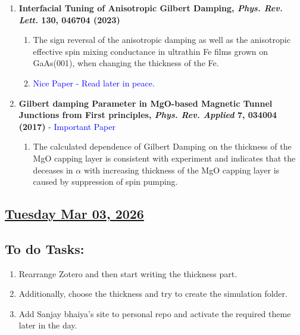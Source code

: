 \begin{enumerate}
\begin{enumerate}[(1.)]
\begin{enumerate}[\ding{217}]
            \item The strong coupling between magnonic and phonic modes in both polycrystalline and single-crystalline CoFe nanomagnets is observed using TRMOKE.
            \item The enhanced coupling strength in the single-crystalline CoFe nanomagnet is attributed to the higher magnetorestriction in CoFe systems and lower intrinsic magnetic damping.
            \item The relative values for the $\mathrm{\alpha_{eff}}$ was observed for different frequencies.
        \end{enumerate}
        \item \textbf{Interfacial Tuning of Anisotropic Gilbert Damping, \textit{Phys. Rev. Lett.} 130, 046704 (2023)} 
        \begin{enumerate}[\ding{217}]
            \item The sign reversal of the anisotropic damping as well as the anisotropic effective spin mixing conductance in ultrathin Fe films grown on GaAs(001), when changing the thickness of the Fe.
            \item \textcolor{blue}{Nice Paper - Read later in peace.}
        \end{enumerate}
        \item \textbf{Gilbert damping Parameter in MgO-based Magnetic Tunnel Junctions from First principles, \textit{Phys. Rev. Applied} 7, 034004 (2017)} - \textcolor{blue}{Important Paper}  
        \begin{enumerate}[\ding{217}]
            \item The calculated dependence of Gilbert Damping on the thickness of the MgO capping layer is consistent with experiment and indicates that the deceases in $\alpha$ with increasing thickness of the MgO capping layer is caused by suppression of spin pumping.
        \end{enumerate}
    \end{enumerate}
\end{enumerate}
\subsection*{\underline{Tuesday Mar 03, 2026}}
\subsection*{To do Tasks:}
\begin{enumerate}
    \item Rearrange Zotero and then start writing the thickness part. \cmark
    \item Additionally, choose the thickness and try to create the simulation folder. \cmark
    \item Add Sanjay bhaiya's site to personal repo and activate the required theme later in the day. \xmark
\end{enumerate}
